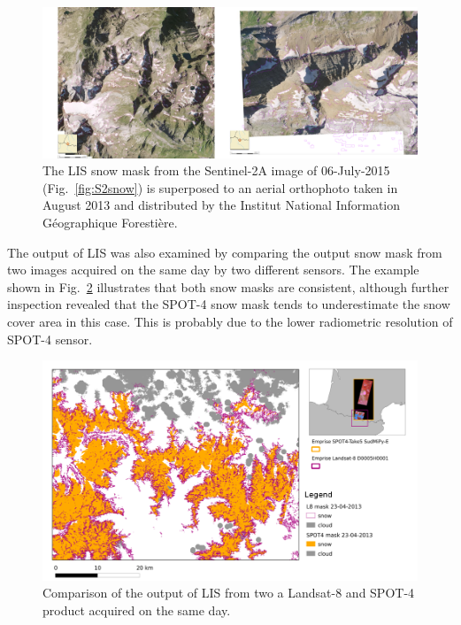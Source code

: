 \documentclass[a4paper]{article}
\begin{document}
\begin{figure}[h]
 \centering
 \includegraphics[width=\textwidth]{./images/Sentinel2_testmontage.png}
 \caption{The LIS snow mask from the Sentinel-2A image of 06-July-2015 (Fig.~\ref{fig:S2snow}) is superposed to an aerial orthophoto taken in August 2013 and distributed by the Institut National Information Géographique Forestière.}
 \label{fig:S2snowzoom}
\end{figure}

The output of LIS was also examined by comparing the output snow mask from two images acquired on the same day by two different sensors. The example shown in Fig.~\ref{fig:L8vsS4-23042013} illustrates that both snow masks are consistent, although further inspection revealed that the SPOT-4 snow mask tends to underestimate the snow cover area in this case. This is probably due to the lower radiometric resolution of SPOT-4 sensor.

\begin{figure}[h]
 \centering
 \includegraphics[width=\textwidth]{./images/L8vsS4-23042013_montage.png}
 \caption{Comparison of the output of LIS from two a Landsat-8 and SPOT-4 product acquired on the same day.}
 \label{fig:L8vsS4-23042013}
\end{figure}
\end{document}
